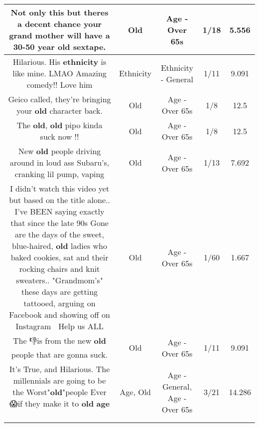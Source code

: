 \documentclass[11pt]{article}
\newlength\mylength
\begin{document}
\begin{center}
\begin{longtable}{|C{.65\mylength}|C{.30\mylength}|C{.12\mylength}|C{.12\mylength}|C{.12\mylength}|}
  \small Not only this but theres a decent chance your grand mother will have a 30-50 year \textbf{old} sextape.\normalsize   & Old & Age - Over 65s & 1/18 & 5.556 \\  \hline
  \small Hilarious. His \textbf{ethnicity} is like mine. LMAO Amazing comedy!! Love him\normalsize   & Ethnicity & Ethnicity - General & 1/11 & 9.091 \\  \hline
  \small Geico called, they're bringing your \textbf{old} character back.\normalsize   & Old & Age - Over 65s & 1/8 & 12.5 \\  \hline
  \small The \textbf{old}, \textbf{old} pipo kinda suck now !!\normalsize   & Old & Age - Over 65s & 1/8 & 12.5 \\  \hline
  \small New \textbf{old} people driving around in loud ass Subaru's, cranking lil pump, vaping\normalsize   & Old & Age - Over 65s & 1/13 & 7.692 \\  \hline
  \small I didn't watch this video yet but based on the title alone.. I've BEEN saying exactly that since the late 90s Gone are the days of the sweet, blue-haired, \textbf{old} ladies who baked cookies, sat and their rocking chairs and knit sweaters.. "Grandmom's" these days are getting tattooed, arguing on Facebook and showing off on Instagram 🤦 Help us ALL\normalsize   & Old & Age - Over 65s & 1/60 & 1.667 \\  \hline
  \small The 👎is from the new \textbf{old} people that are gonna suck.\normalsize   & Old & Age - Over 65s & 1/11 & 9.091 \\  \hline
  \small It's True, and Hilarious. The millennials are going to be the Worst"\textbf{old}"people Ever 😱if they make it to \textbf{old} \textbf{age} 🤣\normalsize   & Age, Old & Age - General, Age - Over 65s & 3/21 & 14.286 \\  \hline

\end{longtable}
\end{center}
\end{document}
